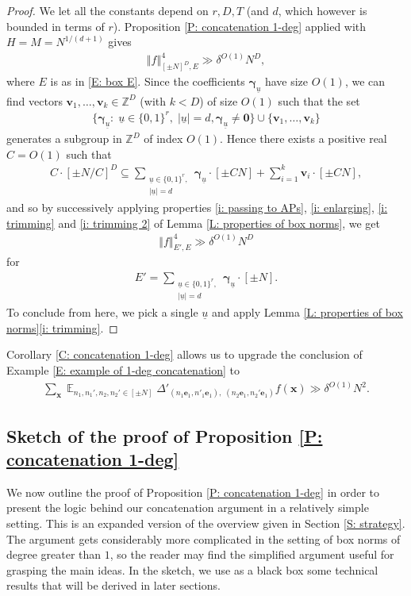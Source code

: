 \documentclass[11pt]{amsart}
\theoremstyle{definition}
\DeclareMathOperator*{\E}{\mathbb{E}}
\newcommand{\Z}{{\mathbb Z}}
\newcommand{\be}{{\mathbf{e}}}
\newcommand{\bv}{{\mathbf{v}}}
\newcommand{\bx}{{\mathbf{x}}}
\newcommand{\bgamma}{{\boldsymbol{\gamma}}}
\newcommand{\uu}{{\underline{u}}}
\newcommand{\norm}[1]{\left\Vert #1\right\Vert}
\begin{document}
\begin{proof} We let all the constants depend on $r, D, T$ (and $d$, which however is bounded in terms of $r$).
Proposition \ref{P: concatenation 1-deg} applied with $H=M=N^{1/(d+1)}$ gives
    \begin{align*}
        \norm{f}_{[\pm N]^D, E}^4\gg \delta^{O(1)}N^D,
    \end{align*}
    where $E$ is as in \eqref{E: box E}. Since the coefficients $\bgamma_\uu$ have size $O(1)$, we can find vectors $\bv_1, \ldots, \bv_k\in\Z^D$ (with $k<D$) of size $O(1)$ such that the set
    \begin{align*}
        \{\bgamma_\uu:\; \uu\in\{0,1\}^r,\; |\uu|=d, \bgamma_\uu \neq \textbf{0}\}\cup \{\bv_1, \ldots, \bv_k\}
    \end{align*}
    generates a subgroup in $\Z^D$ of index $O(1)$. Hence there exists a positive real $C = O(1)$
    such that
    \begin{align*}
        C\cdot [\pm N/C]^D
        \subseteq \sum_{\substack{\uu\in\{0,1\}^r,\\ |\uu|=d}}\bgamma_\uu\cdot[\pm CN]+\sum_{i=1}^k \bv_i\cdot[\pm CN],
    \end{align*}
    and so by successively applying properties \eqref{i: passing to APs}, \eqref{i: enlarging}, \eqref{i: trimming} and \eqref{i: trimming 2} of Lemma \ref{L: properties of box norms}, we get
    \begin{align*}
        \norm{f}_{E', E}^4\gg \delta^{O(1)}N^D
    \end{align*}
    for 
    \begin{align*}
        E' = \sum_{\substack{\uu\in\{0,1\}^r,\\ |\uu|=d}}\bgamma_\uu\cdot[\pm N].
    \end{align*}
    To conclude from here, we pick a single $\uu$ and apply Lemma \ref{L: properties of box norms}\eqref{i: trimming}.  
\end{proof}

Corollary \ref{C: concatenation 1-deg} allows us to upgrade the conclusion of Example \ref{E: example of 1-deg concatenation} to 
\begin{align*}
    \sum_{\bx}\E_{n_1, n_1', n_2, n_2'\in[\pm N]} \Delta'_{(n_1\be_1,n'_1\be_1),\; (n_2\be_1, n_2'\be_1)} f(\bx)\gg \delta^{O(1)}N^{2}.
\end{align*}

\subsection{Sketch of the proof of Proposition \ref{P: concatenation 1-deg}}
We now outline the proof of Proposition \ref{P: concatenation 1-deg} in order to present the logic behind our concatenation argument in a relatively simple setting.  This is an expanded version of the overview given in Section \ref{S: strategy}. The argument gets considerably more complicated in the setting of box norms of degree greater than $1$, so the reader may find the simplified argument useful for grasping the main ideas. In the sketch, we use as a black box some technical results that will be derived in later sections.
 
\end{document}
